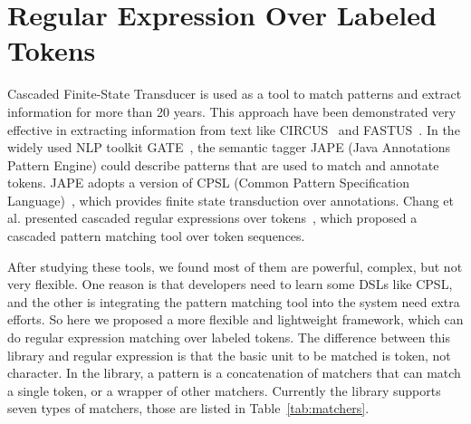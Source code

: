 \section{Regular Expression Over Labeled Tokens}

Cascaded Finite-State Transducer is used as a tool to match patterns and extract information for more than 20 years. This approach have been demonstrated very effective in extracting information from text like CIRCUS~\cite{lehnert1991university} and FASTUS~\cite{hobbs199713}.  In the widely used NLP toolkit GATE~\cite{cunningham2002framework}, the semantic tagger JAPE (Java Annotations Pattern Engine) could describe patterns that are used to match and annotate tokens. JAPE adopts a version of CPSL (Common Pattern  Specification Language)~\cite{appelt1998common}, which provides finite state transduction over annotations. Chang et al. presented cascaded regular expressions over tokens~\cite{chang2014tokensregex}, which proposed a cascaded pattern matching tool over token sequences.

After studying these tools, we found most of them are powerful, complex, but not very flexible. One reason is that developers need to learn some DSLs like CPSL, and the other is  integrating the pattern matching tool into the system need extra efforts. So here we proposed a more flexible and lightweight framework, which can do regular expression matching over labeled tokens. The difference between this library and regular expression is that the basic unit to be matched is token, not character. In the library, a pattern is a concatenation of matchers that can match a single token, or a wrapper of other matchers. Currently the library supports seven types of matchers, those are listed in Table~\ref{tab:matchers}.

